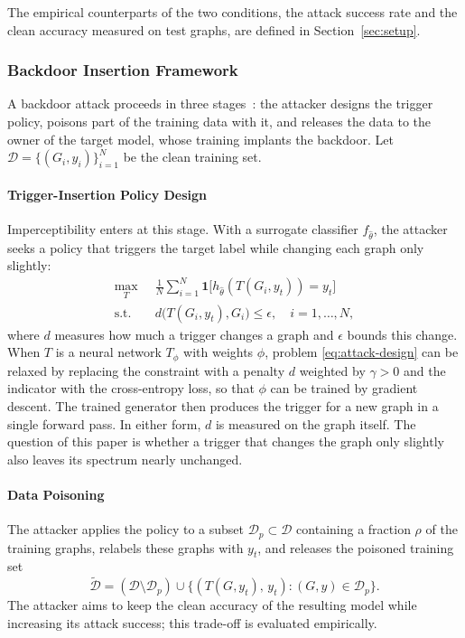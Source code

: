 \documentclass[journal]{IEEEtran}
\newcommand{\calD}{\mathcal{D}}         %
\begin{document}
\noindent
The empirical counterparts of the two conditions, the attack success rate and
the clean accuracy measured on test graphs, are defined in
Section~\ref{sec:setup}.

\subsubsection{Backdoor Insertion Framework}\label{sec:policy}
A backdoor attack proceeds in three stages~\cite{sba2021,gta2021}: the attacker
designs the trigger policy, poisons part of the training data with it, and
releases the data to the owner of the target model, whose training implants
the backdoor. Let $\calD=\{(G_i,y_i)\}_{i=1}^{N}$ be the clean training set.

\paragraph{Trigger-Insertion Policy Design}
Imperceptibility enters at this stage. With a surrogate classifier
$f_{\hat\theta}$, the attacker seeks a policy that triggers the target label
while changing each graph only slightly:
\begin{equation}
\begin{aligned}
\max_{T}\;\; & \frac{1}{N}\sum_{i=1}^{N}
  \mathbf{1}\bigl[h_{\hat\theta}(T(G_i,y_t))=y_t\bigr]\\
\text{s.t.}\;\; & d\bigl(T(G_i,y_t),G_i\bigr)\le\epsilon,\quad i=1,\dots,N,
\end{aligned}
\label{eq:attack-design}
\end{equation}
where $d$ measures how much a trigger changes a graph and $\epsilon$ bounds this
change. When $T$ is a neural network $T_\phi$ with weights $\phi$, problem
\eqref{eq:attack-design} can be relaxed by replacing the constraint with a
penalty $d$ weighted by $\gamma>0$ and the indicator with the cross-entropy
loss, so that
$\phi$ can be trained by gradient descent. The trained generator then produces
the trigger for a new graph in a single forward pass. In either form, $d$ is
measured on the graph itself. The question of this paper is whether a trigger
that changes the graph only slightly also leaves its spectrum nearly unchanged.

\paragraph{Data Poisoning}
The attacker applies the policy to a subset $\calD_p\subset\calD$ containing a
fraction $\rho$ of the training graphs, relabels these graphs with $y_t$, and
releases the poisoned training set
\begin{equation}
\widetilde{\calD}=(\calD\setminus\calD_p)\cup
\bigl\{(T(G,y_t),\,y_t) : (G,y)\in\calD_p\bigr\}.
\label{eq:poisoned-set}
\end{equation}
The attacker aims to keep the clean accuracy of the resulting model while
increasing its attack success; this trade-off is evaluated empirically.
\end{document}
